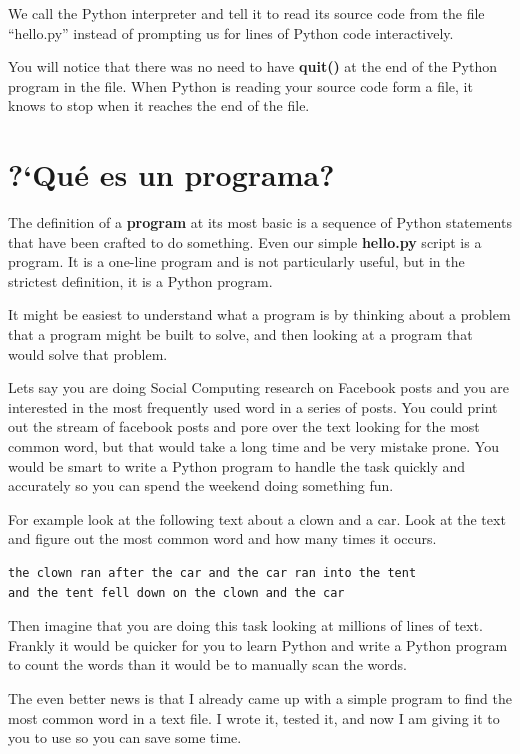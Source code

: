 We call the Python interpreter and tell it to read its source code from
the file ``hello.py'' instead of prompting us for lines of Python code
interactively.

You will notice that there was no need to have {\bf quit()} at the end of
the Python program in the file.   When Python is reading your source code
form a file, it knows to stop when it reaches the end of the file.

\section{?`Qu\'e es un programa?}

The definition of a {\bf program} at its most basic is a sequence
of Python statements that have been crafted to do something.
Even our simple {\bf hello.py} script is a program.  It is a one-line
program and is not particularly useful, but in the strictest definition,
it is a Python program.

It might be easiest to understand what a program is by thinking about a problem 
that a program might be built to solve, and then looking at a program
that would solve that problem.

Lets say you are doing Social Computing research on Facebook posts and 
you are interested in the most frequently used word in a series of posts.
You could print out the stream of facebook posts and pore over the text
looking for the most common word, but that would take a long time and be very 
mistake prone.  You would be smart to write a Python program to handle the
task quickly and accurately so you can spend the weekend doing something 
fun.

For example look at the following text about a clown and a car.  Look at the 
text and figure out the most common word and how many times it occurs.

\beforeverb
\begin{verbatim}
the clown ran after the car and the car ran into the tent 
and the tent fell down on the clown and the car 
\end{verbatim}
\afterverb
%
Then imagine that you are doing this task looking at millions of lines of 
text.  Frankly it would be quicker for you to learn Python and write a 
Python program to count the words than it would be to manually 
scan the words.

The even better news is that I already came up with a simple program to 
find the most common word in a text file.  I wrote it,
tested it, and now I am giving it to you to use so you can save some time.

